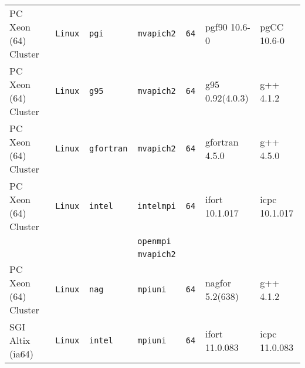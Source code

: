 \begin{tabular}{lllllll}
PC Xeon (64) Cluster  &\tt Linux  &\tt pgi          &\tt mvapich2   &\tt 64              & pgf90 \footnotesize 10.6-0         & pgCC \footnotesize 10.6-0       \\ %
PC Xeon (64) Cluster  &\tt Linux  &\tt g95          &\tt mvapich2   &\tt 64              & g95 \footnotesize 0.92(4.0.3)      & g++ \footnotesize 4.1.2         \\ %
PC Xeon (64) Cluster  &\tt Linux  &\tt gfortran     &\tt mvapich2   &\tt 64              & gfortran \footnotesize 4.5.0       & g++ \footnotesize 4.5.0         \\ %
PC Xeon (64) Cluster  &\tt Linux  &\tt intel        &\tt intelmpi   &\tt 64              & ifort \footnotesize 10.1.017       & icpc \footnotesize 10.1.017     \\ %
                      &           &                 &\tt openmpi    &                    &                                    &                                 \\
                      &           &                 &\tt mvapich2   &                    &                                    &                                 \\
PC Xeon (64) Cluster  &\tt Linux  &\tt nag          &\tt mpiuni     &\tt 64              & nagfor \footnotesize 5.2(638)      & g++  \footnotesize 4.1.2        \\ %
SGI Altix (ia64)      &\tt Linux  &\tt intel        &\tt mpiuni     &\tt 64              & ifort \footnotesize 11.0.083       & icpc \footnotesize 11.0.083     \\ %

\end{tabular}
